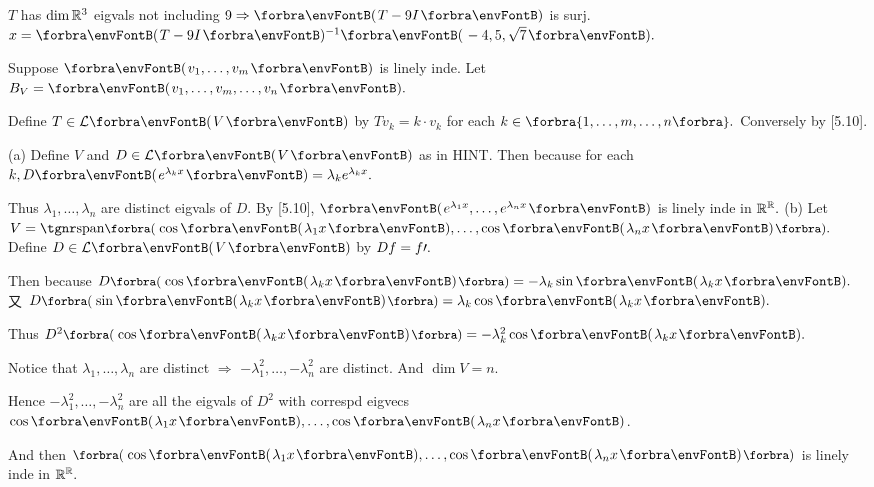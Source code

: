 \documentclass[a4paper, 11pt, UTF8]{article}
\begin{document}
\begin{large}
$T$ has $\dim{\mathbb{R}}^3$ eigvals not including $9\Rightarrow\Par{T-9I}$ is surj. $x=\Par{T-9I}{^{-1}}\Par{-4,5,\sqrt{7}}.$\PfEnd
\SepLine

\par\quad
Suppose $\Par{v_1,\dots,v_m}$ is linely inde. Let $B_V=\Par{v_1,\dots,v_m,\dots,v_n}.$\par\quad
Define $T\in\Lm{V}$ by $Tv_k=k\cdot v_k$ for each $k\in\Bra{1,\dots,m,\dots,n}.$ Conversely by [5.10].\PfEnd\vspace{-4pt}
\SepLine

\par\quad
(a) Define $V$ and $D\in\Lm{V}$ as in H{\small INT}. Then because for each $k, D\Par{e^{\lambda_k x}}=\lambda_k e^{\lambda_k x}.$\par\quad\Ha
Thus $\lambda_1,\dots,\lambda_n$ are distinct eigvals of $D.$ By [5.10], $\Par{e^{\lambda_1x},\dots,e^{\lambda_nx}}$ is linely inde in ${\mathbb{R}}^{{\mathbb{R}}}.$\PfEnd\vspace{4pt}\quad
(b) Let $V=\Span[\BigPar]{\cos\Par{\lambda_1 x},\dots,\cos\Par{\lambda_n x}}.$ Define $D\in\Lm{V}$ by $Df=f\prime.$\par\quad\Hb
Then because $D\BigPar{\cos\Par{\lambda_k x}}=-\lambda_k\sin\Par{\lambda_k x}.$ 又 $D\BigPar{\sin\Par{\lambda_k x}}=\lambda_k\cos\Par{\lambda_k x}.$\par\quad\Hb
Thus $D^2\BigPar{\cos\Par{\lambda_k x}}=-\lambda_k^2\cos\Par{\lambda_k x}.$\par\quad\Hb
Notice that $\lambda_1,\dots,\lambda_n$ are distinct $\Longrightarrow$ $-\lambda_1^2,\dots,-\lambda_n^2$ are distinct. And $\dim V=n.$\par\quad\Hb
Hence $-\lambda_1^2,\dots,-\lambda_n^2$ are all the eigvals of $D^2$ with correspd eigvecs $\cos\Par{\lambda_1 x},\dots,\cos\Par{\lambda_n x}$.\par\quad\Hb
And then $\BigPar{\cos\Par{\lambda_1 x},\dots,\cos\Par{\lambda_n x}}$ is linely inde in ${\mathbb{R}}^{{\mathbb{R}}}.$\PfEnd
\SepLine


\end{large}
\end{document}
